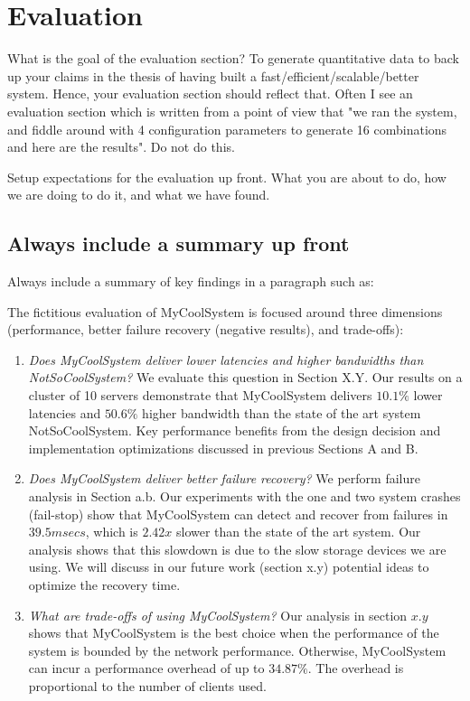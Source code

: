 \section{Evaluation}
What is the goal of the evaluation section? To generate quantitative data to back up your claims in the thesis of having built a fast/efficient/scalable/better system. Hence, your evaluation section should reflect that. Often I see an evaluation section which is written from a point of view that "we ran the system, and fiddle around with 4 configuration parameters to generate 16 combinations and here are the results". Do not do this. 

Setup expectations for the evaluation up front. What you are about to do, how we are doing to do it, and what we have found. 

\subsection*{Always include a summary up front}
Always include a summary of key findings in a paragraph such as: 
\begin{tcolorbox}[colback=green!5,colframe=gray!40!black,title=Example of Evaluation Summary]
The fictitious evaluation of MyCoolSystem is focused around three dimensions (performance, better failure recovery (negative results), and trade-offs): 
\begin{enumerate}
    \item \textit{Does MyCoolSystem deliver lower latencies and higher bandwidths than NotSoCoolSystem?} We evaluate this question in Section X.Y. Our results on a cluster of 10 servers demonstrate that MyCoolSystem delivers $10.1\%$ lower latencies and $50.6\%$ higher bandwidth than the state of the art system NotSoCoolSystem. Key performance benefits from the design decision and implementation optimizations discussed in previous Sections A and B. 
    
    \item \textit{Does MyCoolSystem deliver better failure recovery?} We perform failure analysis in Section a.b. Our experiments with the one and two system crashes (fail-stop) show that MyCoolSystem can detect and recover from failures in $39.5msecs$, which is $2.42x$ slower than the state of the art system. Our analysis shows that this slowdown is due to the slow storage devices we are using. We will discuss in our future work (section x.y) potential ideas to optimize the recovery time. 
    
    \item \textit{What are trade-offs of using MyCoolSystem?} Our analysis in section $x.y$ shows that MyCoolSystem is the best choice when the performance of the system is bounded by the  network performance. Otherwise, MyCoolSystem can incur a performance overhead of up to $34.87\%$. The overhead is proportional to the number of clients used. 
\end{enumerate}
\end{tcolorbox}

